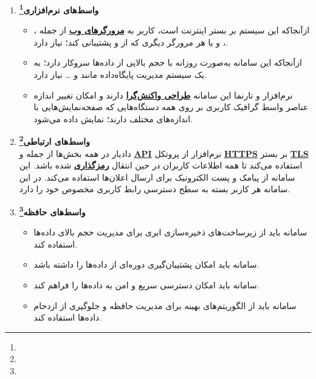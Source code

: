 \documentclass[12pt,a4paper,oneside]{article}
\begin{document}
\begin{enumerate}
\begin{itemize}
	\end{itemize}


	\item 
	\textbf{واسط‌های نرم‌افزاری\footnote{}}
		\begin{itemize}
			\item
							ازآنجاکه این سیستم بر بستر اینترنت است، کاربر به 
			\hyperref[ref:browser]{\textbf{مرورگرهای وب}}
			از جمله
			، ، 
			و یا هر مرورگر دیگری که از 
			 و 
			پشتیبانی کند؛ نیاز دارد.
			
			\item
			 ازآنجاکه این سامانه به‌صورت روزانه
			با حجم بالایی از داده‌ها سروکار دارد؛ به یک سیستم 
			مدیریت پایگاه‌داده مانند
			و … نیاز دارد.
			
			\item
			   نرم‌افزار و تارنما این سامانه 
			\hyperref[ref:responsivedesign]{\textbf{طراحی واکنش‌گرا}}
			دارند و امکان تغییر اندازه عناصر واسط گرافیک کاربری بر روی همه دستگاه‌هایی که صفحه‌نمایش‌هایی با اندازه‌های مختلف دارند؛ نمایش داده می‌شود.
		\end{itemize}

		\item 
		\textbf{واسط‌های ارتباطی\footnote{}}
		\\
		دادیار در همه بخش‌ها از جمله 
		 و
		  \hyperref[ref:api]{\textbf{API}}
		  نرم‌افزار از پروتکل 
		  \hyperref[ref:https]{\textbf{HTTPS}}
		   بر بستر 
		   \hyperref[ref:tls]{\textbf{TLS}}
			استفاده می‌کند تا همه اطلاعات کاربران در حین انتقال 
			\hyperref[ref:encryption]{\textbf{رمزگذاری}}
			 شده باشد. این سامانه از پیامک و پست الکترونیک برای ارسال اعلان‌ها استفاده می‌کند. در این سامانه هر کاربر بسته به سطح دسترسی رابط کاربری مخصوص خود را دارد.

		\item 
		\textbf{واسط‌های حافظه\footnote{}}

		\begin{itemize}
				\item سامانه باید از زیرساخت‌های ذخیره‌سازی ابری برای مدیریت حجم بالای داده‌ها استفاده کند.
			     \item سامانه باید امکان پشتیبان‌گیری دوره‌ای از داده‌ها را داشته باشد.
			     \item سامانه باید امکان دسترسی سریع و امن به داده‌ها را فراهم کند.
			     \item سامانه باید از الگوریتم‌های بهینه برای مدیریت حافظه و جلوگیری از ازدحام داده‌ها استفاده کند.
		\end{itemize}


\end{enumerate}
\end{document}
